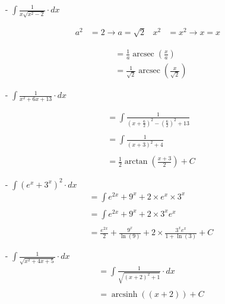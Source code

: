 \documentclass{report}
\DeclareMathOperator{\arcsec}{arcsec}
\DeclareMathOperator{\arcsinh}{arcsinh}
\begin{document}
  \newpage

  \begin{itemize}
    \item[-] $\displaystyle{\int \frac{1}{x \sqrt{x^2 - 2}} \cdot dx}$

      \begin{align*}
        a^2 & = 2 \to a = \sqrt{2} & x^2 & = x^2 \to x = x
      \end{align*}

      \begin{align*}
      & = \frac{1}{a}\arcsec(\frac{x}{a})\\ & =\frac{1}{\sqrt{2}}\arcsec(\frac{x}{\sqrt{2}})
      \end{align*}
  \end{itemize}

  \newpage

  \begin{itemize}
    \item[-] $\displaystyle{\int \frac{1}{x^2 + 6x + 13} \cdot dx}$

      \begin{align*}
        & = \int \frac{1}{(x + \frac{6}{2})^2 - (\frac{6}{2})^2 + 13}\\ \\
        & = \int \frac{1}{(x + 3)^2 + 4}\\ \\
        & = \frac{1}{2} \arctan(\frac{x + 3}{2}) + C
      \end{align*}
  \end{itemize}

  \newpage

  \begin{itemize}
    \item[-] $\displaystyle{\int (e^x + 3^x)^2 \cdot dx}$
      \begin{align*}
        & = \int e^{2x} + 9^x + 2 \times e^x \times 3^x\\ \\
        & = \int e^{2x} + 9^x + 2 \times 3^x e^x \\ \\
        & = \frac{e^{2x}}{2} + \frac{9^x}{\ln(9)} + 2 \times \frac{3^x e^x}{1 + \ln(3)} + C
      \end{align*}
  \end{itemize}

  \newpage

  \begin{itemize}
    \item[-] $\displaystyle{\int \frac{1}{\sqrt{x^2 + 4x + 5}} \cdot dx}$
      \begin{align*}
        & = \int \frac{1}{\sqrt{(x + 2)^2 + 1}} \cdot dx \\ \\
        & = \arcsinh((x + 2)) + C
      \end{align*}
  \end{itemize}
\end{document}
